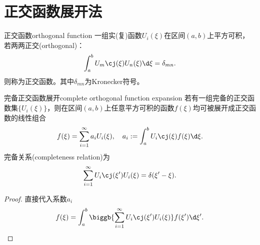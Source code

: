 \section{正交函数展开法}
\label{sec:orthogonal functions and expansions}


\begin{definition}{正交函数}{orthogonal function}
    一组实(复)函数$U_i(\xi)$在区间$(a,b)$上平方可积，若两两正交(orthogonal)：
    \begin{equation}
        \int_a^bU_m\cj(\xi)U_n(\xi)\d\xi=\delta_{mn}.
    \end{equation}
    则称为正交函数。其中$\delta_{mn}$为Kronecker符号。
\end{definition}

\begin{theorem}
    {完备正交函数展开}{complete orthogonal function expansion}
    若有一组完备的正交函数集$\{U_i(\xi)\}$，则在区间$(a,b)$上任意平方可积的函数$f(\xi)$均可被展开成正交函数的线性组合
    \[
        f(\xi)=\sum_{i=1}^\infty a_iU_i(\xi),\quad a_i:=\int_a^bU_i\cj(\xi)f(\xi)\d\xi.
    \]
    完备关系(completeness relation)为
    \begin{equation}
        \sum_{i=1}^\infty U_i\cj(\xi')U_i(\xi)=\delta(\xi'-\xi).
    \end{equation}
\end{theorem}

\begin{proof}
    直接代入系数$a_i$
    \[
        f(\xi)=\int_a^b\biggb{\sum_{i=1}^\infty U_i\cj(\xi')U_i(\xi)}f(\xi')\d\xi'.
        \qedhere
    \]
\end{proof}

